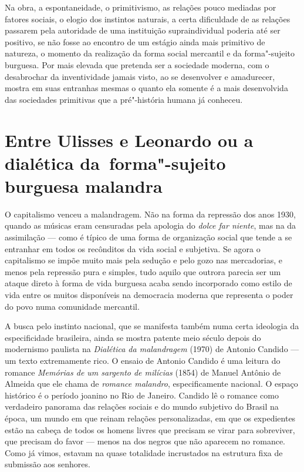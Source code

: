 Na obra, a espontaneidade, o primitivismo, as relações pouco mediadas
por fatores sociais, o elogio dos instintos naturais, a certa
dificuldade de as relações passarem pela autoridade de uma instituição
supraindividual poderia até ser positivo, se não fosse ao encontro de um
estágio ainda mais primitivo de natureza, o momento da realização da
forma social mercantil e da forma"-sujeito burguesa. Por mais elevada que
pretenda ser a sociedade moderna, com o desabrochar da inventividade
jamais visto, ao se desenvolver e amadurecer, mostra em suas entranhas
mesmas o quanto ela somente é a mais desenvolvida das sociedades
primitivas que a pré"-história humana já conheceu.

\section*{Entre Ulisses e Leonardo ou a dialética da~forma"-sujeito burguesa malandra}

O capitalismo venceu a malandragem. Não na forma da repressão dos anos
1930, quando as músicas eram censuradas pela apologia do \emph{dolce far
niente}, mas na da assimilação --- como é típico de uma forma de
organização social que tende a se entranhar em todos os recônditos da
vida social e subjetiva. Se agora o capitalismo se impõe muito mais pela
sedução e pelo gozo nas mercadorias, e menos pela repressão pura e
simples, tudo aquilo que outrora parecia ser um ataque direto à forma de
vida burguesa acaba sendo incorporado como estilo de vida entre os
muitos disponíveis na democracia moderna que representa o poder do povo
numa comunidade mercantil.

A busca pelo instinto nacional, que se manifesta também numa certa
ideologia da especificidade brasileira, ainda se mostra patente meio
século depois do modernismo paulista na \emph{Dialética da malandragem}
(1970) de Antonio Candido --- um texto extremamente rico. O
ensaio de Antonio Candido é uma leitura do romance \emph{Memórias de um
sargento de milícias} (1854) de Manuel Antônio de Almeida que ele chama
de \emph{romance malandro}, especificamente nacional. O espaço histórico
é o período joanino no Rio de Janeiro. Candido lê o romance como
verdadeiro panorama das relações sociais e do mundo subjetivo do Brasil
na época, um mundo em que reinam relações personalizadas, em que os
expedientes estão na cabeça de todos os homens livres que precisam se
virar para sobreviver, que precisam do favor --- menos na dos negros que
não aparecem no romance. Como já vimos, estavam na quase totalidade
incrustados na estrutura fixa de submissão aos senhores.

